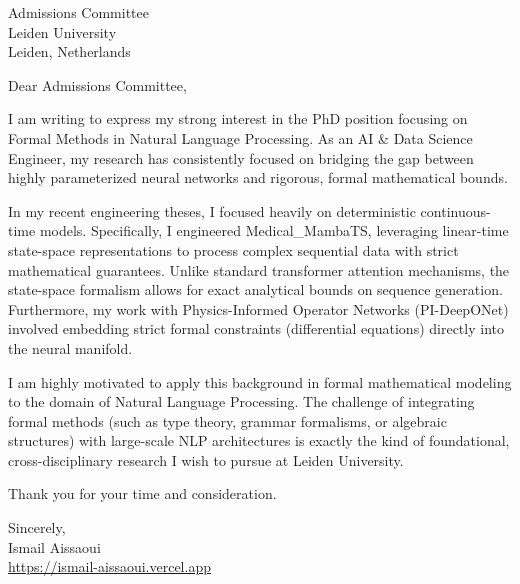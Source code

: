 \documentclass[11pt, a4paper]{letter}
\begin{document}
\begin{letter}{Admissions Committee \\ Leiden University \\ Leiden, Netherlands}
\opening{Dear Admissions Committee,}

I am writing to express my strong interest in the PhD position focusing on Formal Methods in Natural Language Processing. As an AI \& Data Science Engineer, my research has consistently focused on bridging the gap between highly parameterized neural networks and rigorous, formal mathematical bounds.

In my recent engineering theses, I focused heavily on deterministic continuous-time models. Specifically, I engineered Medical\_MambaTS, leveraging linear-time state-space representations to process complex sequential data with strict mathematical guarantees. Unlike standard transformer attention mechanisms, the state-space formalism allows for exact analytical bounds on sequence generation. Furthermore, my work with Physics-Informed Operator Networks (PI-DeepONet) involved embedding strict formal constraints (differential equations) directly into the neural manifold.

I am highly motivated to apply this background in formal mathematical modeling to the domain of Natural Language Processing. The challenge of integrating formal methods (such as type theory, grammar formalisms, or algebraic structures) with large-scale NLP architectures is exactly the kind of foundational, cross-disciplinary research I wish to pursue at Leiden University.

Thank you for your time and consideration.

\closing{Sincerely, \\ Ismail Aissaoui \\ \href{https://ismail-aissaoui.vercel.app}{https://ismail-aissaoui.vercel.app}}
\end{letter}
\end{document}
